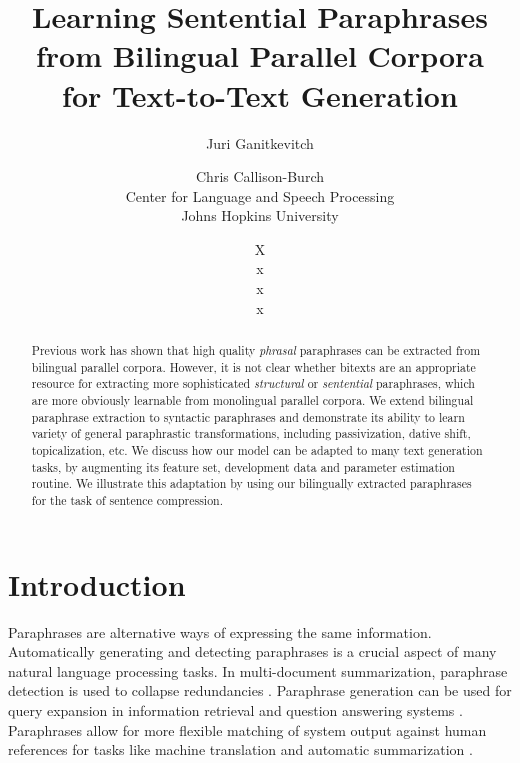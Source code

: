 \documentclass[11pt]{article}
\title{Learning Sentential Paraphrases from Bilingual Parallel Corpora \\ for Text-to-Text Generation}
\author{Juri Ganitkevitch \and Chris Callison-Burch\\ 
Center for Language and Speech Processing\\ 
Johns Hopkins University}
\author{X\\ 
x\\ 
x\\ 
x}
\date{}
\begin{document}
\maketitle

\begin{abstract}
Previous work has shown that high quality {\it phrasal} paraphrases can be extracted from  bilingual parallel corpora.  However, it is not clear whether bitexts are an appropriate resource for extracting more sophisticated {\it structural} or {\it sentential} paraphrases, which are more obviously learnable from monolingual parallel corpora.
We extend bilingual paraphrase extraction to syntactic paraphrases
and demonstrate its ability to learn variety of general paraphrastic transformations, 
including passivization, dative shift, topicalization, etc.  We discuss how our model can be adapted to many text generation tasks, by augmenting its feature set, development data and parameter estimation routine.  We illustrate this adaptation by using our bilingually extracted paraphrases for the task of sentence compression. 
\end{abstract}


\section{Introduction} \label{introduction}

Paraphrases are alternative ways of expressing the same information. 
Automatically generating and detecting paraphrases is a crucial aspect of many 
natural language processing tasks.
In multi-document summarization, paraphrase detection is used
to collapse redundancies \cite{Barzilay1999,BarzilayThesis}. Paraphrase generation can be used 
for query expansion in information retrieval and question
answering systems \cite{mckeown:1979:ACL,Anick1999,Ravichandran2002,Riezler2007}. 
Paraphrases allow for more flexible matching of system output against human references for tasks like machine translation and automatic summarization \cite{Zhou2006b,Kauchak2006,Owczarzak2006,Madnani2007,Snover2010}. 
\end{document}

